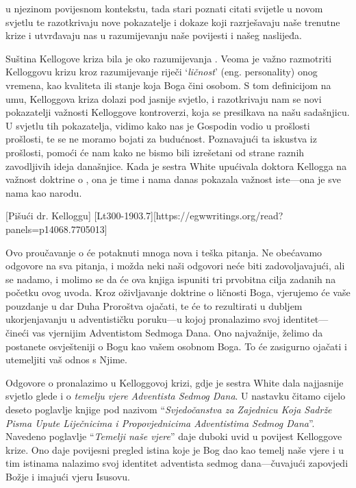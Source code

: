 u njezinom povijesnom kontekstu, tada stari poznati citati svijetle u novom svjetlu te razotkrivaju nove pokazatelje i dokaze koji razrješavaju naše trenutne krize i utvrđavaju nas u razumijevanju naše povijesti i našeg naslijeđa.

Suština Kellogove kriza bila je oko razumijevanja . Veoma je važno razmotriti Kelloggovu krizu kroz razumijevanje riječi ‘\textit{ličnost}’ (eng. personality) onog vremena, kao kvaliteta ili stanje koja Boga čini osobom. S tom definicijom na umu, Kelloggova kriza dolazi pod jasnije svjetlo, i razotkrivaju nam se novi pokazatelji važnosti Kelloggove kontroverzi, koja se presilkava na našu sadašnjicu. U svjetlu tih pokazatelja, vidimo kako nas je Gospodin vodio u prošlosti prošlosti, te se ne moramo bojati za budućnost. Poznavajući ta iskustva iz prošlosti, pomoći će nam kako ne bismo bili izrešetani od strane raznih zavodljivih ideja današnjice. Kada je sestra White upućivala doktora Kellogga na važnost doktrine o , ona je time i nama danas pokazala važnost iste—ona je sve nama kao narodu.

[Pišući dr. Kelloggu] [Lt300-1903.7][https://egwwritings.org/read?panels=p14068.7705013]

Ovo proučavanje o  će potaknuti mnoga nova i teška pitanja. Ne obećavamo odgovore na sva pitanja, i možda neki naši odgovori neće biti zadovoljavajući, ali se nadamo, i molimo se da će ova knjiga ispuniti tri prvobitna cilja zadanih na početku ovog uvoda. Kroz oživljavanje doktrine o ličnosti Boga, vjerujemo će vaše pouzdanje u dar Duha Proroštva ojačati, te će to rezultirati u dubljem ukorjenjavanju u adventističku poruku—u kojoj pronalazimo svoj identitet—čineći vas vjernijim Adventistom Sedmoga Dana. Ono najvažnije, želimo da postanete osvješteniji o Bogu kao vašem osobnom Boga. To će zasigurno ojačati i utemeljiti vaš odnos s Njime.

Odgovore o  pronalazimo u Kelloggovoj krizi, gdje je sestra White dala najjasnije svjetlo glede  i o \textit{temelju vjere Adventista Sedmog Dana}. U nastavku čitamo cijelo deseto poglavlje knjige pod nazivom “\textit{Svjedočanstva za Zajednicu Koja Sadrže Pisma Upute Liječnicima i Propovjednicima Adventistima Sedmog Dana}”. Navedeno poglavlje “\textit{Temelji naše vjere}” daje duboki uvid u povijest Kelloggove krize. Ono daje povijesni pregled istina koje je Bog dao kao temelj naše vjere i u tim istinama nalazimo svoj identitet adventista sedmog dana—čuvajući zapovjedi Božje i imajući vjeru Isusovu.
